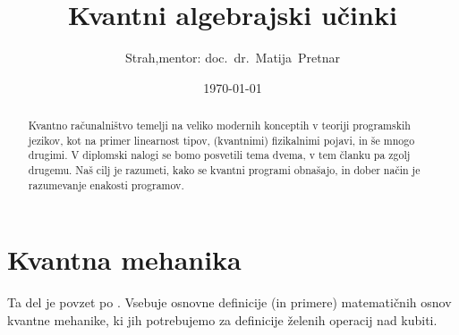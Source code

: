 \documentclass[a4paper,slovene]{article}
\title{Kvantni algebrajski učinki}
\author{Strah,\quad mentor: doc.~dr.~Matija~Pretnar}
\date{\today}
\begin{document}
\maketitle

\begin{abstract}

    Kvantno računalništvo temelji na veliko modernih konceptih v teoriji programskih jezikov,
    kot na primer linearnost tipov, (kvantnimi) fizikalnimi pojavi, in še mnogo drugimi.
    V diplomski nalogi se bomo posvetili tema dvema, v tem članku pa zgolj drugemu.
    Naš cilj je razumeti, kako se kvantni programi obnašajo,
    in dober način je razumevanje enakosti programov.


\end{abstract}


\section{Kvantna mehanika}

Ta del je povzet po \cite{ess-qc}.
Vsebuje osnovne definicije (in primere) matematičnih osnov kvantne mehanike,
ki jih potrebujemo za definicije želenih operacij nad kubiti.
\end{document}
